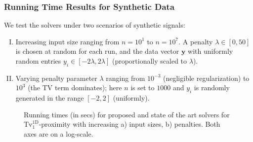 \documentclass[twoside,11pt]{article}
\newcommand{\vy}{\bm{y}}       \newcommand{\vyh}{\hat{\bm{y}}}        \newcommand{\yh}{\hat{y}}    \newcommand{\vyt}{\tilde{\bm{y}}}       \newcommand{\yt}{\tilde{y}}
\newcommand{\tvell}{\text{Tv}}
\newcommand{\oned}{\text{1D}}
\numberwithin{equation}{section}
\numberwithin{theorem}{section}
\begin{document}
\subsubsection{Running Time Results for Synthetic Data}

We test the solvers under two scenarios of synthetic signals:\vspace*{-5pt}
\begin{enumerate}[I)]
  \setlength{\itemsep}{1pt}
 \item Increasing input size ranging from $n=10^1$ to $n=10^7$. A penalty $\lambda \in [0,50]$ is chosen at random for each run, and the data vector $\vy$ with uniformly random entries $y_i \in [-2 \lambda, 2 \lambda]$ (proportionally scaled to $\lambda$).
 \item Varying penalty parameter $\lambda$ ranging from $10^{-3}$ (negligible regularization) to $10^3$ (the TV term dominates); here $n$ is set to $1000$ and $y_i$ is randomly generated in the range $[-2, 2]$ (uniformly).
\end{enumerate}

\begin{figure}[ht]
  \centering
  \caption{Running times (in secs) for proposed and state of the art solvers for $\tvell_1^{\oned}$-proximity with increasing a)  input sizes, b) penalties. Both axes are on a log-scale.
   }   \label{fig:tv1run}
\end{figure}
\end{document}
